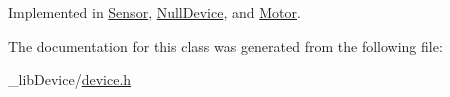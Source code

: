 Implemented in \hyperlink{class_sensor_a9b3ea7f61f41b68a4fb9141d887a7271}{Sensor}, \hyperlink{class_null_device_a414a0c887b1edb54fa085d4ad2c50def}{Null\+Device}, and \hyperlink{class_motor_a8ef8df58afeba551f02b8e4afbd23c50}{Motor}.



The documentation for this class was generated from the following file\+:\begin{DoxyCompactItemize}
\item 
\+\_\+lib\+Device/\hyperlink{device_8h}{device.\+h}\end{DoxyCompactItemize}
